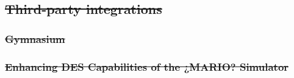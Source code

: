 \documentclass[ASNA]{USG} %
\begin{document}

\subsection{\sout{Third-party integrations}}

\subsubsection{\sout{Gymnasium}}
\subsubsection{\sout{Enhancing DES Capabilities of the ¿MARIO? Simulator}}












\end{document}
